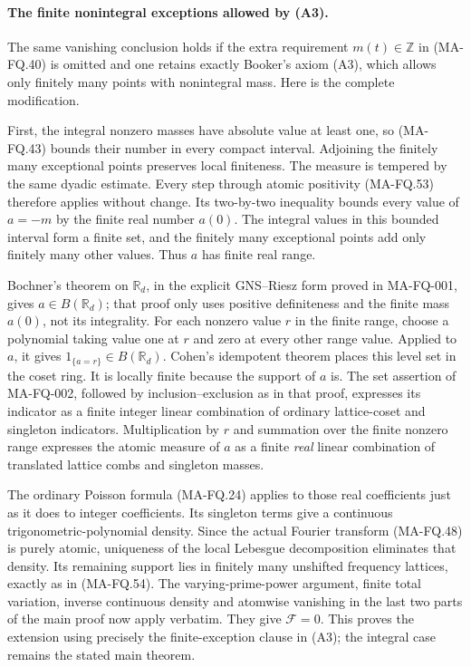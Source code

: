 \paragraph{The finite nonintegral exceptions allowed by (A3).}
The same vanishing conclusion holds if the extra requirement
$m(t)\in\mathbb Z$ in (MA-FQ.40) is omitted and one retains
exactly Booker's axiom (A3), which allows only finitely many
points with nonintegral mass. Here is the complete modification.

First, the integral nonzero masses have absolute value at least
one, so (MA-FQ.43) bounds their number in every compact interval.
Adjoining the finitely many exceptional points preserves local
finiteness. The measure is tempered by the same dyadic estimate.
Every step through atomic positivity (MA-FQ.53) therefore applies
without change. Its two-by-two inequality bounds every value
of $a=-m$ by the finite real number $a(0)$. The integral values
in this bounded interval form a finite set, and the finitely
many exceptional points add only finitely many other values.
Thus $a$ has finite real range.

Bochner's theorem on $\mathbb R_d$, in the explicit
GNS--Riesz form proved in MA-FQ-001, gives
$a\in B(\mathbb R_d)$; that proof only uses positive
definiteness and the finite mass $a(0)$, not its integrality.
For each nonzero value $r$ in the finite range, choose a
polynomial taking value one at $r$ and zero at every other
range value. Applied to $a$, it gives
$1_{\{a=r\}}\in B(\mathbb R_d)$.
Cohen's idempotent theorem places this level set in the
coset ring. It is locally finite because the support of
$a$ is. The set assertion of MA-FQ-002, followed by
inclusion--exclusion as in that proof, expresses its
indicator as a finite integer linear combination of
ordinary lattice-coset and singleton indicators.
Multiplication by $r$ and summation over the finite
nonzero range expresses the atomic measure of $a$
as a finite \emph{real} linear combination of translated
lattice combs and singleton masses.

The ordinary Poisson formula (MA-FQ.24) applies to those
real coefficients just as it does to integer coefficients.
Its singleton terms give a continuous trigonometric-polynomial
density. Since the actual Fourier transform (MA-FQ.48) is
purely atomic, uniqueness of the local Lebesgue decomposition
eliminates that density. Its remaining support lies in
finitely many unshifted frequency lattices, exactly as in
(MA-FQ.54). The varying-prime-power argument, finite total
variation, inverse continuous density and atomwise vanishing
in the last two parts of the main proof now apply verbatim.
They give $\mathcal F=0$. This proves the extension using
precisely the finite-exception clause in (A3); the integral
case remains the stated main theorem.


